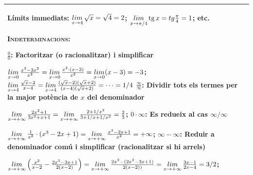\begin{center}
\begin{longtable}[h]{|p{}|p{}|}
		 \multicolumn{2}{|p{\textwidth}|}{
			 Límits immediats: $\mathop{lim}\limits_{x\to 4} \sqrt{x} = \sqrt{4}=2$;  $\mathop{lim}\limits_{x\to \pi/4} \mathrm{tg}\, x = tg \frac{\pi}{4}=1$; etc. \par
			 \textsc{\bf Indeterminacions}:\par
		 	  \begin{itemize}
		 	  	\exer[2] $\frac{0}{0}$: Factoritzar (o racionalitzar) i simplificar \par
		 	  		 $\mathop{lim}\limits_{x\to 0} \frac{x^3-3x^2}{x^2} = \mathop{lim}\limits_{x\to 0} \frac{x^2\cdot(x-3)}{x^2} = \mathop{lim}\limits_{x\to 0} (x-3)=-3$;
		 	  		 $\mathop{lim}\limits_{x\to 4} \frac{\sqrt{x}-2}{x-4} = \mathop{lim}\limits_{x\to 4} \frac{(\sqrt{x}-2)(\sqrt{x}+2)}{(x-4)(\sqrt{x}+2)}= \cdots = 1/4$ \vspace{0.4cm}
		 	  	\exer[2] $\frac{\infty}{\infty}$: Dividir tots els termes per la major potència de $x$ del denominador \par
		 	  	  $\mathop{lim}\limits_{x\to +\infty} \frac{2x^2+1}{3x^2+x+1} = \mathop{lim}\limits_{x\to +\infty} \frac{2+1/x^2}{3+1/x+1/x^2}=\frac{2}{3}$;
		 	  	  \vspace{0.4cm}
		 	  	\exer[2] $0 \cdot \infty$: Es redueix al cas $\infty/\infty$ \par
		 	  	$\mathop{lim}\limits_{x\to +\infty} \frac{1}{x^2} \cdot (x^3-2x+1) = \mathop{lim}\limits_{x\to +\infty} \frac{x^3-2x+1}{x^2}=+\infty$;
		 	  	  \vspace{0.4cm}
		 	  	  \exer[2] $\infty-\infty$: Reduir a denominador comú i simplificar (racionalitzar si hi arrels) \par
		 	  	  $\mathop{lim}\limits_{x\to +\infty}\left( \frac{x^2}{x-2} - \frac{2x^3-3x+1}{2(x-2)}\right) = \mathop{lim}\limits_{x\to +\infty} \frac{2x^2-(2x^2-3x+1)}{2(x-2))}=\mathop{lim}\limits_{x\to +\infty} \frac{3x-1}{2x-4}=3/2$;
		 	  \end{itemize} 
	 	} \\ [0.5ex] \hline
 	
		 
	\end{longtable}
\end{center}
	\vspace{-0.5cm}
